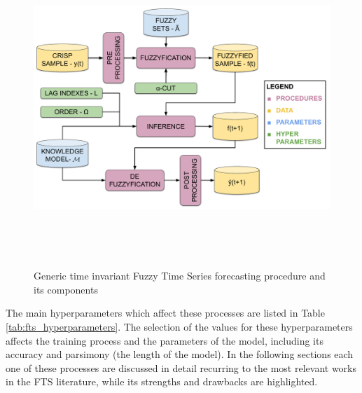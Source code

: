 \begin{figure}
    \centering
    \includegraphics[width=\textwidth,height=12cm]{figures/fts_forecasting.pdf}
    \caption{Generic time invariant Fuzzy Time Series forecasting procedure and its components}
    \label{fig:fts_forecasting}
\end{figure}


The main hyperparameters which affect these processes are listed in Table \ref{tab:fts_hyperparameters}. The selection of the values for these hyperparameters affects the training process and the parameters of the model, including its accuracy and parsimony (the length of the model).  In the following sections each one of these processes are discussed in detail recurring to the most relevant works in the FTS literature, while its strengths and drawbacks are highlighted.

